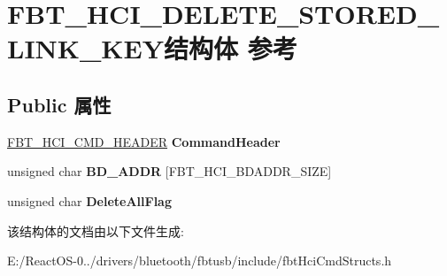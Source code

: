 \hypertarget{struct_f_b_t___h_c_i___d_e_l_e_t_e___s_t_o_r_e_d___l_i_n_k___k_e_y}{}\section{F\+B\+T\+\_\+\+H\+C\+I\+\_\+\+D\+E\+L\+E\+T\+E\+\_\+\+S\+T\+O\+R\+E\+D\+\_\+\+L\+I\+N\+K\+\_\+\+K\+E\+Y结构体 参考}
\label{struct_f_b_t___h_c_i___d_e_l_e_t_e___s_t_o_r_e_d___l_i_n_k___k_e_y}
\subsection*{Public 属性}
\begin{DoxyCompactItemize}
\item 
\mbox{\label{struct_f_b_t___h_c_i___d_e_l_e_t_e___s_t_o_r_e_d___l_i_n_k___k_e_y_a64fd46bc1b083f733f9fd76ef696064b}} 
\hyperlink{struct_f_b_t___h_c_i___c_m_d___h_e_a_d_e_r}{F\+B\+T\+\_\+\+H\+C\+I\+\_\+\+C\+M\+D\+\_\+\+H\+E\+A\+D\+ER} {\bfseries Command\+Header}
\item 
\mbox{\label{struct_f_b_t___h_c_i___d_e_l_e_t_e___s_t_o_r_e_d___l_i_n_k___k_e_y_a1b1afe16fd4eca330de4a47a2804b408}} 
unsigned char {\bfseries B\+D\+\_\+\+A\+D\+DR} \mbox{[}F\+B\+T\+\_\+\+H\+C\+I\+\_\+\+B\+D\+A\+D\+D\+R\+\_\+\+S\+I\+ZE\mbox{]}
\item 
\mbox{\label{struct_f_b_t___h_c_i___d_e_l_e_t_e___s_t_o_r_e_d___l_i_n_k___k_e_y_ad23d663f42f46ede22f288e56710d97b}} 
unsigned char {\bfseries Delete\+All\+Flag}
\end{DoxyCompactItemize}


该结构体的文档由以下文件生成\+:\begin{DoxyCompactItemize}
\item 
E\+:/\+React\+O\+S-\/0../drivers/bluetooth/fbtusb/include/fbt\+Hci\+Cmd\+Structs.\+h\end{DoxyCompactItemize}
